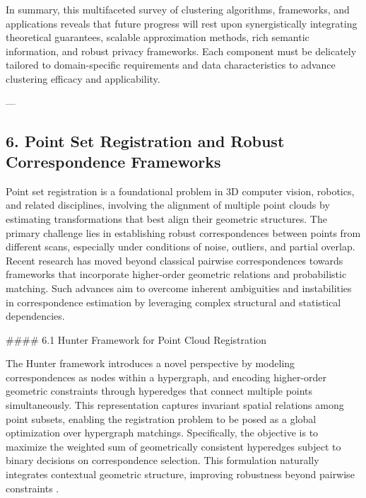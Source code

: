 \documentclass[11pt]{article}
\begin{document}
In summary, this multifaceted survey of clustering algorithms, frameworks, and applications reveals that future progress will rest upon synergistically integrating theoretical guarantees, scalable approximation methods, rich semantic information, and robust privacy frameworks. Each component must be delicately tailored to domain-specific requirements and data characteristics to advance clustering efficacy and applicability.


---

\subsection{6. Point Set Registration and Robust Correspondence Frameworks}

Point set registration is a foundational problem in 3D computer vision, robotics, and related disciplines, involving the alignment of multiple point clouds by estimating transformations that best align their geometric structures. The primary challenge lies in establishing robust correspondences between points from different scans, especially under conditions of noise, outliers, and partial overlap. Recent research has moved beyond classical pairwise correspondences towards frameworks that incorporate higher-order geometric relations and probabilistic matching. Such advances aim to overcome inherent ambiguities and instabilities in correspondence estimation by leveraging complex structural and statistical dependencies.

#### 6.1 Hunter Framework for Point Cloud Registration

The Hunter framework introduces a novel perspective by modeling correspondences as nodes within a hypergraph, and encoding higher-order geometric constraints through hyperedges that connect multiple points simultaneously. This representation captures invariant spatial relations among point subsets, enabling the registration problem to be posed as a global optimization over hypergraph matchings. Specifically, the objective is to maximize the weighted sum of geometrically consistent hyperedges subject to binary decisions on correspondence selection. This formulation naturally integrates contextual geometric structure, improving robustness beyond pairwise constraints \cite{ref6}.
\end{document}
